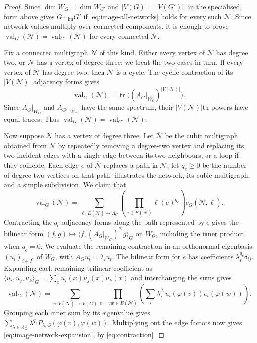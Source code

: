 \documentclass[10pt,a4paper]{article}
\theoremstyle{plain}
\theoremstyle{definition}
\DeclareMathOperator{\tr}{tr}
\DeclareMathOperator{\val}{val}
\begin{document}
\begin{proof}
Since $\dim W_G=\dim W_{G'}$ and $|V(G)|=|V(G')|$, \cite[Theorem~9]{Young2025} in the specialised form above
gives $G\sim_{\mathrm{im}}G'$ if \cref{eq:image-all-networks} holds
for every such $\mathcal N$.
Since network values multiply over connected components, it is enough
to prove $\val_G(\mathcal N)=\val_{G'}(\mathcal N)$ for every connected $\mathcal N$.

Fix a connected multigraph $\mathcal N$ of this kind. Either every vertex of
$\mathcal N$ has degree two, or $\mathcal N$ has a vertex of degree three; we treat the
two cases in turn.
If every vertex of $\mathcal N$ has degree two, then $\mathcal N$ is a cycle.
The cyclic contraction of its $|V(\mathcal N)|$ adjacency forms gives
\begin{equation}\label{eq:degree-two-trace}
 \val_G(\mathcal N)=\tr\bigl((A_G|_{W_G})^{|V(\mathcal N)|}\bigr).
\end{equation}
Since $A_G|_{W_G}$ and $A_{G'}|_{W_{G'}}$ have the same spectrum,
their $|V(\mathcal N)|$th powers have equal traces. Thus $\val_G(\mathcal N)=\val_{G'}(\mathcal N)$.

Now suppose $\mathcal N$ has a vertex of degree three.
Let $\overline{\mathcal N}$ be the cubic multigraph obtained from $\mathcal N$ by repeatedly
removing a degree-two vertex and replacing its two incident edges with
a single edge between its two neighbours, or a loop if they coincide.
Each edge $e$ of $\overline{\mathcal N}$ replaces a path in $\mathcal N$; let
$q_e\geq0$ be the number of degree-two vertices on that path.
 illustrates the network, its cubic multigraph,
and a simple subdivision.
We claim that
\begin{equation}\label{eq:image-network-expansion}
 \val_G(\mathcal N)=\sum_{\ell:E(\overline{\mathcal N})\to\Lambda_G}
 \left(\prod_{e\in E(\overline{\mathcal N})}\ell(e)^{q_e}\right)c_G(\overline{\mathcal N},\ell).
\end{equation}
Contracting the $q_e$ adjacency forms along the path represented by $e$
gives the bilinear form
$(f,g)\mapsto\langle f,(A_G|_{W_G})^{q_e}g\rangle_G$ on $W_G$,
including the inner product when $q_e=0$.
We evaluate the remaining contraction in an orthonormal eigenbasis
$(u_i)_{i\in I^*}$ of $W_G$, with $A_Gu_i=\lambda_i u_i$.
The bilinear form for $e$ has coefficients $\lambda_i^{q_e}\delta_{ij}$.
Expanding each remaining trilinear coefficient as
$\langle u_i,u_j,u_k\rangle_G=\sum_xu_i(x)u_j(x)u_k(x)$ and
interchanging the sums gives
\begin{equation}\label{eq:image-network-vertex-expansion}
 \val_G(\mathcal N)=\sum_{\varphi:V(\overline{\mathcal N})\to V(G)}
 \prod_{e=vw\in E(\overline{\mathcal N})}
 \left(\sum_i\lambda_i^{q_e}u_i(\varphi(v))u_i(\varphi(w))\right).
\end{equation}
Grouping each inner sum by its eigenvalue gives
$\sum_{\lambda\in\Lambda_G}\lambda^{q_e}P_{\lambda,G}(\varphi(v),\varphi(w))$.
Multiplying out the edge factors now gives
\cref{eq:image-network-expansion}, by \cref{eq:contraction}.


\end{proof}
\end{document}
